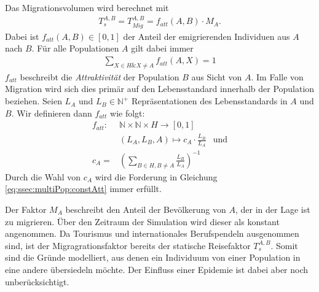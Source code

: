 Das Migrationsvolumen wird berechnet mit
\begin{align}
	T^{A,B}_s=T^{A,B}_{Mig} = f_{att}(A,B)\cdot M_A.
\end{align}
Dabei ist $f_{att}(A,B) \in [0,1]$ der Anteil der emigrierenden Individuen aus $A$ nach $B$. Für alle Populationen $A$ gilt dabei immer
\begin{align}
	\sum\limits_{X \in H \& X\neq A} f_{att}(A,X) = 1\label{eq:ssec:multiPop:constAtt}
\end{align}
$f_{att}$ beschreibt die \emph{Attraktivität} der Population $B$ aus Sicht von $A$. Im Falle von Migration wird sich dies primär auf den Lebensstandard innerhalb der Population beziehen. Seien $L_A$ und $L_B\in \mathbb{N^+}$ Repräsentationen des Lebensstandards in $A$ und $B$. Wir definieren dann $f_{att}$ wie folgt:
\begin{align}
		f_{att} :& \mathbb{N}\times \mathbb{N}\times H \rightarrow  [0,1]\\
			 & (L_A,L_B,A)\longmapsto		c_A\cdot\frac{L_B}{L_A}& \text{und}\nonumber\\
		c_A = & \left( \sum\limits_{B\in H, B\neq A} \frac{L_B}{L_A}\right)^{-1}&
\end{align}
Durch die Wahl von $c_A$ wird die Forderung in Gleichung \ref{eq:ssec:multiPop:constAtt} immer erfüllt.

Der Faktor $M_A$ beschreibt den Anteil der Bevölkerung von $A$, der in der Lage ist zu migrieren. Über den Zeitraum der Simulation wird dieser als konstant angenommen. Da Tourismus und internationales Berufspendeln ausgenommen sind, ist der Migragrationsfaktor bereits der statische Reisefaktor $T^{A,B}_s$. Somit sind die Gründe modelliert, aus denen ein Individuum von einer Population in eine andere übersiedeln möchte. Der Einfluss einer Epidemie ist dabei aber noch unberücksichtigt. 

